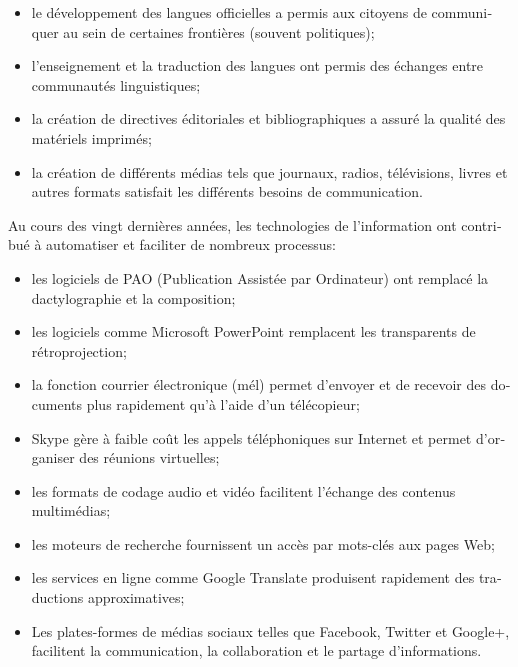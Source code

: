 \begin{french}
\begin{multicols}{2}
\begin{itemize}
\item le développement des langues officielles a permis aux citoyens
  de communiquer au sein de certaines frontières (souvent politiques);

\item l'enseignement et la traduction des langues ont permis des
  échanges entre communautés linguistiques;

\item la création de directives éditoriales et bibliographiques a
  assuré la qualité des matériels imprimés;

\item la création de différents médias tels que journaux, radios,
  télévisions, livres et autres formats satisfait les différents
  besoins de communication.

\end{itemize}

Au cours des vingt dernières années, les technologies de
l'information ont contribué à automatiser et faciliter de
nombreux processus:

\begin{itemize}

\item les logiciels de PAO (Publication Assistée par Ordinateur) ont
  remplacé la dactylographie et la composition;

\item les logiciels comme Microsoft PowerPoint remplacent les
  transparents de rétroprojection;

\item la fonction courrier électronique (mél) permet d'envoyer
  et de recevoir des documents plus rapidement qu'à l'aide d'un télécopieur;

\item Skype gère à faible coût les appels téléphoniques sur Internet
  et permet d'organiser des réunions virtuelles;

\item les formats de codage audio et vidéo facilitent l'échange des
  contenus multimédias;

\item les moteurs de recherche fournissent un accès par mots-clés aux
  pages Web;

\item les services en ligne comme Google Translate produisent rapidement des
  traductions approximatives;

\item Les plates-formes de médias sociaux telles que Facebook, Twitter
  et Google+, facilitent la communication, la collaboration et le
  partage d'informations.


\end{itemize}
\end{multicols}
\end{french}
